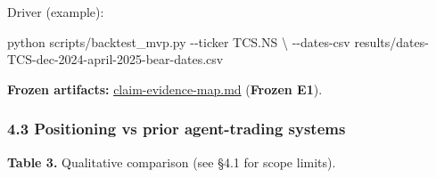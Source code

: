 \documentclass[
]{article}
\newenvironment{Shaded}{}{}
\newcommand{\AttributeTok}[1]{\textcolor[rgb]{0.49,0.56,0.16}{#1}}
\newcommand{\DataTypeTok}[1]{\textcolor[rgb]{0.56,0.13,0.00}{#1}}
\newcommand{\ExtensionTok}[1]{#1}
\newcommand{\NormalTok}[1]{#1}
\begin{document}
Driver (example):

\begin{Shaded}
\begin{Highlighting}[]
\ExtensionTok{python}\NormalTok{ scripts/backtest\_mvp.py }\AttributeTok{{-}{-}ticker}\NormalTok{ TCS.NS }\DataTypeTok{\textbackslash{}}
  \AttributeTok{{-}{-}dates{-}csv}\NormalTok{ results/dates{-}TCS{-}dec{-}2024{-}april{-}2025{-}bear{-}dates.csv}
\end{Highlighting}
\end{Shaded}

\textbf{Frozen artifacts:} \url{claim-evidence-map.md} (\textbf{Frozen
E1}).

\subsubsection{4.3 Positioning vs prior agent-trading
systems}\label{positioning-vs-prior-agent-trading-systems}

\textbf{Table 3.} Qualitative comparison (see §4.1 for scope limits).
\end{document}
